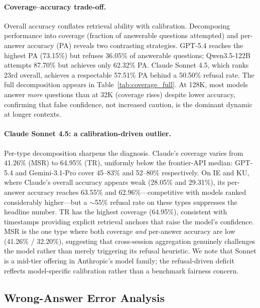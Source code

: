 \documentclass{llmxive}
\begin{document}
\paragraph{Coverage--accuracy trade-off.}
\label{app:coverage_analysis}

Overall accuracy conflates retrieval ability with calibration. Decomposing performance into coverage (fraction of answerable questions attempted) and per-answer accuracy (PA) reveals two contrasting strategies. GPT-5.4 reaches the highest PA (73.15\%) but refuses 36.05\% of answerable questions; Qwen3.5-122B attempts 87.70\% but achieves only 62.32\% PA. Claude Sonnet 4.5, which ranks 23rd overall, achieves a respectable 57.51\% PA behind a 50.50\% refusal rate. The full decomposition appears in Table~\ref{tab:coverage_full}. At 128K, most models answer \emph{more} questions than at 32K (coverage rises) despite lower accuracy, confirming that false confidence, not increased caution, is the dominant dynamic at longer contexts.

\paragraph{Claude Sonnet 4.5: a calibration-driven outlier.}
Per-type decomposition sharpens the diagnosis. Claude's coverage varies from 41.26\% (MSR) to 64.95\% (TR), uniformly below the frontier-API median: GPT-5.4 and Gemini-3.1-Pro cover 45--83\% and 52--80\% respectively. On IE and KU, where Claude's overall accuracy appears weak (28.05\% and 29.31\%), its per-answer accuracy reaches 63.55\% and 62.96\%---competitive with models ranked considerably higher---but a ${\sim}$55\% refusal rate on these types suppresses the headline number. TR has the highest coverage (64.95\%), consistent with timestamps providing explicit retrieval anchors that raise the model's confidence. MSR is the one type where both coverage \emph{and} per-answer accuracy are low (41.26\% / 32.20\%), suggesting that cross-session aggregation genuinely challenges the model rather than merely triggering its refusal heuristic. We note that Sonnet is a mid-tier offering in Anthropic's model family; the refusal-driven deficit reflects model-specific calibration rather than a benchmark fairness concern.


\subsection{Wrong-Answer Error Analysis}
\label{app:wrong_answer_taxonomy}
\end{document}
